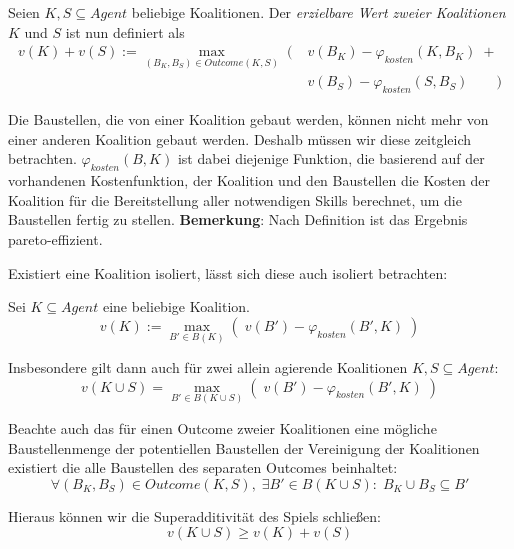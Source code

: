 \documentclass[sigconf]{acmart}
\theoremstyle{break}
\begin{document}
\begin{definition}
  Seien $K, S \subseteq Agent$ beliebige Koalitionen. Der \textit{erzielbare Wert zweier Koalitionen} $K$ und $S$ ist nun definiert als
\begin{align}
  v(K) + v(S) := \max_{(B_K, B_S)\in Outcome(K,S)} \;(\;
  &v(B_K) - \varphi_{kosten}(K, B_K) \;+ \\ &v(B_S) - \varphi_{kosten}(S, B_S) \qquad)
\end{align}

\noindent
Die Baustellen, die von einer Koalition gebaut werden, können nicht mehr von einer anderen Koalition gebaut werden. Deshalb müssen wir diese zeitgleich betrachten.
$\varphi_{kosten}(B,K)$ ist dabei diejenige Funktion, die basierend auf der vorhandenen Kostenfunktion, der Koalition und den Baustellen die Kosten der Koalition für die Bereitstellung aller notwendigen Skills berechnet, um die Baustellen fertig zu stellen.
\textbf{Bemerkung}: Nach Definition ist das Ergebnis pareto-effizient.
\end{definition}

\noindent
Existiert eine Koalition isoliert, lässt sich diese auch isoliert betrachten:
\begin{definition}
  Sei $K \subseteq Agent$ eine beliebige Koalition.
  \begin{equation}
    v(K) := \max_{B'\in B(K)} \left(\; v(B') - \varphi_{kosten}(B', K) \;\right)
  \end{equation}
\end{definition}

\noindent
Insbesondere gilt dann auch für zwei allein agierende Koalitionen $K, S \subseteq Agent$:
\begin{equation}
  v(K\cup S) = \max_{B'\in B(K\cup S)} \left(\; v(B')-\varphi_{kosten}(B', K) \;\right)
\end{equation}

\noindent
Beachte auch das für einen Outcome zweier Koalitionen eine mögliche Baustellenmenge der potentiellen Baustellen der Vereinigung der Koalitionen existiert die alle Baustellen des separaten Outcomes beinhaltet:
\begin{equation}
  \forall (B_K, B_S)\in Outcome(K,S),\; \exists B'\in B(K\cup S):\; B_K\cup B_S\subseteq B'
\end{equation}

\noindent
Hieraus können wir die Superadditivität des Spiels schließen:
\begin{equation}
  v(K\cup S) \geq v(K) + v(S)
\end{equation}
\end{document}

